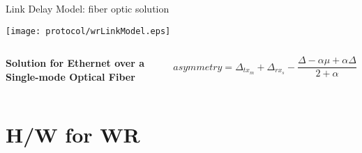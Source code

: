\documentclass[compress,red]{beamer}
\begin{document}
\begin{frame}{Link Delay Model: fiber optic solution}

  \begin{center}
  \texttt{[image: protocol/wrLinkModel.eps]}
  \end{center}

  \begin{columns}[c]
  \column{1.5in}

    \begin{center}
      \textbf{Solution for Ethernet over a Single-mode Optical Fiber}
    \end{center}    

  \column{2.7in}

    \begin{equation}
      \nonumber asymmetry = \Delta_{tx_m} + \Delta_{rx_s} - \frac{\Delta - \alpha \mu + \alpha \Delta}{2 + \alpha}
    \end{equation}

  \end{columns}

\end{frame}
% 
% 
\section{H/W for WR}
\end{document}
